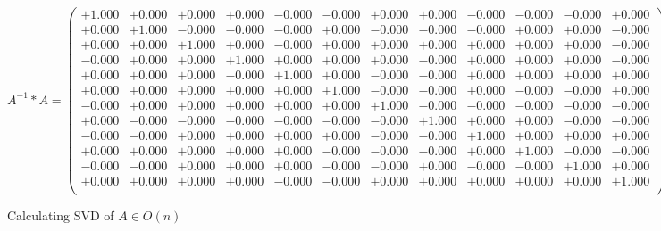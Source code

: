\documentclass[9pt]{article}
\theoremstyle{plain}
\theoremstyle{definition}
\theoremstyle{remark}
\numberwithin{equation}{section}
\begin{document}
$A^{-1} *A = \left(
\begin{array}{
cccccccccccc}
+1.000 & +0.000 & +0.000 & +0.000 & -0.000 & -0.000 & +0.000 & +0.000 & -0.000 & -0.000 & -0.000 & +0.000 \\
+0.000 & +1.000 & -0.000 & -0.000 & -0.000 & +0.000 & -0.000 & -0.000 & -0.000 & +0.000 & +0.000 & -0.000 \\
+0.000 & +0.000 & +1.000 & +0.000 & -0.000 & +0.000 & +0.000 & +0.000 & +0.000 & +0.000 & +0.000 & -0.000 \\
-0.000 & +0.000 & +0.000 & +1.000 & +0.000 & +0.000 & +0.000 & -0.000 & +0.000 & +0.000 & +0.000 & -0.000 \\
+0.000 & +0.000 & +0.000 & -0.000 & +1.000 & +0.000 & -0.000 & -0.000 & +0.000 & +0.000 & +0.000 & +0.000 \\
+0.000 & +0.000 & +0.000 & +0.000 & +0.000 & +1.000 & -0.000 & -0.000 & +0.000 & -0.000 & -0.000 & +0.000 \\
-0.000 & +0.000 & +0.000 & +0.000 & +0.000 & +0.000 & +1.000 & -0.000 & -0.000 & -0.000 & -0.000 & -0.000 \\
+0.000 & -0.000 & -0.000 & -0.000 & -0.000 & -0.000 & -0.000 & +1.000 & +0.000 & +0.000 & -0.000 & -0.000 \\
-0.000 & -0.000 & +0.000 & +0.000 & +0.000 & +0.000 & -0.000 & -0.000 & +1.000 & +0.000 & +0.000 & +0.000 \\
+0.000 & +0.000 & +0.000 & +0.000 & +0.000 & -0.000 & -0.000 & -0.000 & +0.000 & +1.000 & -0.000 & -0.000 \\
-0.000 & -0.000 & +0.000 & +0.000 & +0.000 & -0.000 & -0.000 & +0.000 & -0.000 & -0.000 & +1.000 & +0.000 \\
+0.000 & +0.000 & +0.000 & +0.000 & -0.000 & -0.000 & +0.000 & +0.000 & +0.000 & +0.000 & +0.000 & +1.000 \\
\end{array}
\right)$ \newline 

Calculating SVD of  $A \in O(n)$
\end{document}
